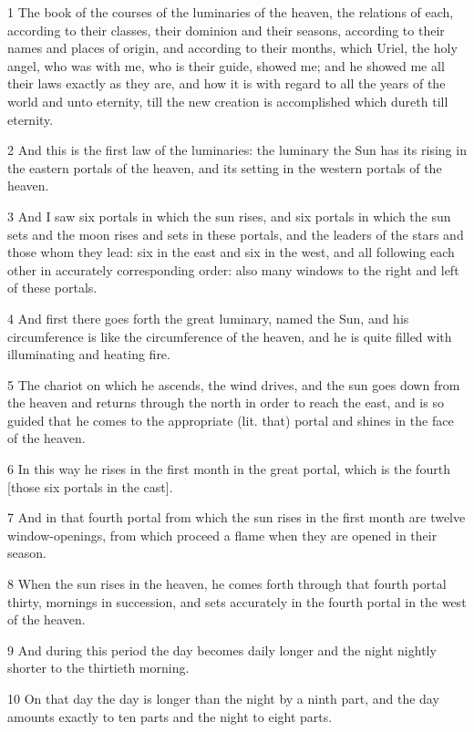 \par 1 The book of the courses of the luminaries of the heaven, the relations of each, according to their classes, their dominion and their seasons, according to their names and places of origin, and according to their months, which Uriel, the holy angel, who was with me, who is their guide, showed me; and he showed me all their laws exactly as they are, and how it is with regard to all the years of the world and unto eternity, till the new creation is accomplished which dureth till eternity.
\par 2 And this is the first law of the luminaries: the luminary the Sun has its rising in the eastern portals of the heaven, and its setting in the western portals of the heaven.
\par 3 And I saw six portals in which the sun rises, and six portals in which the sun sets and the moon rises and sets in these portals, and the leaders of the stars and those whom they lead: six in the east and six in the west, and all following each other in accurately corresponding order: also many windows to the right and left of these portals.
\par 4 And first there goes forth the great luminary, named the Sun, and his circumference is like the circumference of the heaven, and he is quite filled with illuminating and heating fire.
\par 5 The chariot on which he ascends, the wind drives, and the sun goes down from the heaven and returns through the north in order to reach the east, and is so guided that he comes to the appropriate (lit. that) portal and shines in the face of the heaven.
\par 6 In this way he rises in the first month in the great portal, which is the fourth [those six portals in the cast].
\par 7 And in that fourth portal from which the sun rises in the first month are twelve window-openings, from which proceed a flame when they are opened in their season.
\par 8 When the sun rises in the heaven, he comes forth through that fourth portal thirty, mornings in succession, and sets accurately in the fourth portal in the west of the heaven.
\par 9 And during this period the day becomes daily longer and the night nightly shorter to the thirtieth morning.
\par 10 On that day the day is longer than the night by a ninth part, and the day amounts exactly to ten parts and the night to eight parts.
